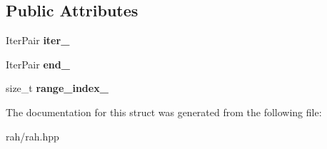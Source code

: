 \subsection*{Public Attributes}
\begin{DoxyCompactItemize}
\item 
\mbox{\label{struct_r_a_h___n_a_m_e_s_p_a_c_e_1_1view_1_1join__iterator_ae222062be5abe02dc362a6050cd09ee2}} 
Iter\+Pair {\bfseries iter\+\_\+}
\item 
\mbox{\label{struct_r_a_h___n_a_m_e_s_p_a_c_e_1_1view_1_1join__iterator_adc53be5590b6f4a9e8d7634fdc48d188}} 
Iter\+Pair {\bfseries end\+\_\+}
\item 
\mbox{\label{struct_r_a_h___n_a_m_e_s_p_a_c_e_1_1view_1_1join__iterator_a115eb3aea1bead65f13e62505315ee50}} 
size\+\_\+t {\bfseries range\+\_\+index\+\_\+}
\end{DoxyCompactItemize}


The documentation for this struct was generated from the following file\+:\begin{DoxyCompactItemize}
\item 
rah/rah.\+hpp\end{DoxyCompactItemize}

